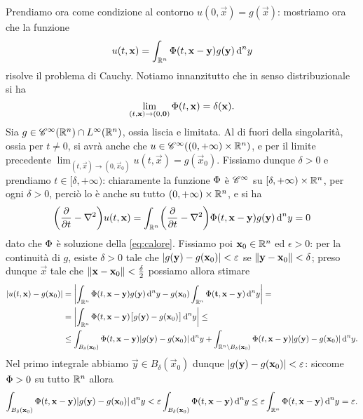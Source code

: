 Prendiamo ora come condizione al contorno $u(0,\vec x)=g(\vec x)$: mostriamo ora che la funzione
\begin{equation}
    u(t,\vec x)=\int_{\R^n}\sfc(t,\vec x-\vec y)g(\vec y)\,\dd^ny
    \label{eq:soluzione-calore-convoluzione}
\end{equation}
risolve il problema di Cauchy.
Notiamo innanzitutto che in senso distribuzionale si ha
\begin{equation}
    \lim_{(t,\vec x)\to(0,\vec 0)}\sfc(t,\vec x)=\delta(\vec x).
\end{equation}
Sia $g\in\cont[\infty]{\R^n}\cap\leb[\infty]{\R^n}$, ossia liscia e limitata.
Al di fuori della singolarità, ossia per $t\ne 0$, si avrà anche che $u\in\cont[\infty]{(0,+\infty)\times\R^n}$, e per il limite precedente $\lim_{(t,\vec x)\to(0,\vec x_0)}u(t,\vec x)=g(\vec x_0)$.
Fissiamo dunque $\delta>0$ e prendiamo $t\in[\delta,+\infty)$: chiaramente la funzione $\sfc$ è $\cclass[\infty]$ su $[\delta,+\infty)\times\R^n$, per ogni $\delta>0$, perciò lo è anche su tutto $(0,+\infty)\times\R^n$, e si ha
\begin{equation}
    \biggl(\drp{}{t}-\lap\biggr)u(t,\vec x)=
    \int_{\R^n}\biggl(\drp{}{t}-\lap\biggr)\sfc(t,\vec x-\vec y)g(\vec y)\,\dd^ny=
    0
\end{equation}
dato che $\sfc$ è soluzione della \eqref{eq:calore}.
Fissiamo poi $\vec x_0\in\R^n$ ed $\epsilon>0$: per la continuità di $g$, esiste $\delta>0$ tale che $\abs{g(\vec y)-g(\vec x_0)}<\epsilon$ se $\norm{\vec y-\vec x_0}<\delta$; preso dunque $\vec x$ tale che $\norm{\vec x-\vec x_0}<\frac{\delta}2$ possiamo allora stimare
\begin{equation}
    \begin{split}
        \abs{u(t,\vec x)-g(\vec x_0)}&=
        \abs[\bigg]{\int_{\R^n}\sfc(t,\vec x-\vec y)g(\vec y)\,\dd^ny-g(\vec x_0)\int_{\R^n}\sfc(\vec t,\vec x-\vec y)\,\dd^ny}=\\ &=
        \abs[\bigg]{\int_{\R^n}\sfc(t,\vec x-\vec y)\bigl[g(\vec y)-g(\vec x_0)\bigr]\,\dd^ny}\le\\ &\le
        \int_{B_\delta(\vec x_0)}\sfc(t,\vec x-\vec y)\abs{g(\vec y)-g(\vec x_0)}\,\dd^ny+
        \int_{\R^n\setminus B_\delta(\vec x_0)}\sfc(t,\vec x-\vec y)\abs{g(\vec y)-g(\vec x_0)}\,\dd^ny.
    \end{split}
\end{equation}
Nel primo integrale abbiamo $\vec y\in B_\delta(\vec x_0)$ dunque $\abs{g(\vec y)-g(\vec x_0)}<\epsilon$: siccome $\sfc>0$ su tutto $\R^n$ allora
\begin{equation}
    \int_{B_\delta(\vec x_0)}\sfc(t,\vec x-\vec y)\abs{g(\vec y)-g(\vec x_0)}\,\dd^ny< 
    \epsilon\int_{B_\delta(\vec x_0)}\sfc(t,\vec x-\vec y)\,\dd^ny\le
    \epsilon\int_{\R^n}\sfc(t,\vec x-\vec y)\,\dd^ny=
    \epsilon.
\end{equation}

